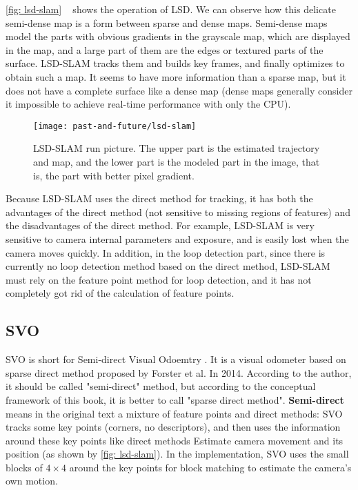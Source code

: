 \autoref{fig: lsd-slam} ~ shows the operation of LSD. We can observe how this delicate semi-dense map is a form between sparse and dense maps. Semi-dense maps model the parts with obvious gradients in the grayscale map, which are displayed in the map, and a large part of them are the edges or textured parts of the surface. LSD-SLAM tracks them and builds key frames, and finally optimizes to obtain such a map. It seems to have more information than a sparse map, but it does not have a complete surface like a dense map (dense maps generally consider it impossible to achieve real-time performance with only the CPU).

\begin{figure}[! ht]
\centering
\texttt{[image: past-and-future/lsd-slam]}
\caption{LSD-SLAM run picture. The upper part is the estimated trajectory and map, and the lower part is the modeled part in the image, that is, the part with better pixel gradient. }
\label{fig: lsd-slam}
\end{figure}

Because LSD-SLAM uses the direct method for tracking, it has both the advantages of the direct method (not sensitive to missing regions of features) and the disadvantages of the direct method. For example, LSD-SLAM is very sensitive to camera internal parameters and exposure, and is easily lost when the camera moves quickly. In addition, in the loop detection part, since there is currently no loop detection method based on the direct method, LSD-SLAM must rely on the feature point method for loop detection, and it has not completely got rid of the calculation of feature points.

\subsection{SVO}

SVO is short for Semi-direct Visual Odoemtry \textsuperscript{\cite{Forster2014}}. It is a visual odometer based on sparse direct method proposed by Forster et al. In 2014. According to the author, it should be called "semi-direct" method, but according to the conceptual framework of this book, it is better to call "sparse direct method". \textbf{Semi-direct} means in the original text a mixture of feature points and direct methods: SVO tracks some key points (corners, no descriptors), and then uses the information around these key points like direct methods Estimate camera movement and its position (as shown by \autoref{fig: lsd-slam}). In the implementation, SVO uses the small blocks of $ 4 \times4 $ around the key points for block matching to estimate the camera's own motion.

